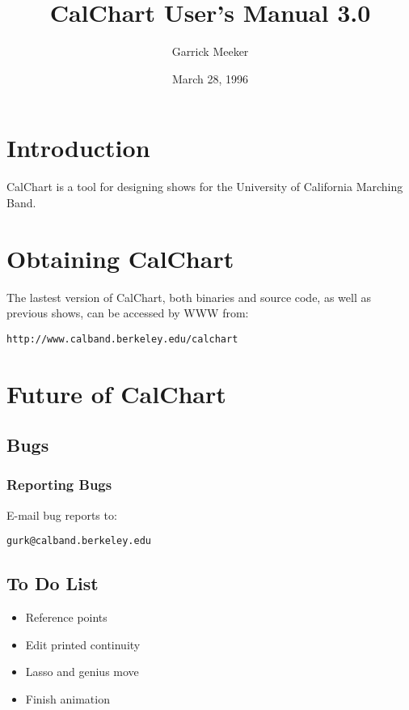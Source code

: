 \title{CalChart User's Manual 3.0}
\author{Garrick Meeker}
\date{March 28, 1996}
\makeindex

\maketitle
\tableofcontents

\chapter{Introduction}

CalChart is a tool for designing shows for the University of California
Marching Band.

\chapter{Obtaining CalChart}

The lastest version of CalChart, both binaries and source code, as well as
previous shows, can be accessed by WWW from:

\begin{verbatim}
http://www.calband.berkeley.edu/calchart
\end{verbatim}

\chapter{Future of CalChart}

\section{Bugs}
\subsection{Reporting Bugs}
E-mail bug reports to:

\begin{verbatim}
gurk@calband.berkeley.edu
\end{verbatim}

\section{To Do List}
\begin{itemize}\itemsep=0pt
\item Reference points
\item Edit printed continuity
\item Lasso and genius move
\item Finish animation
\end{itemize}


